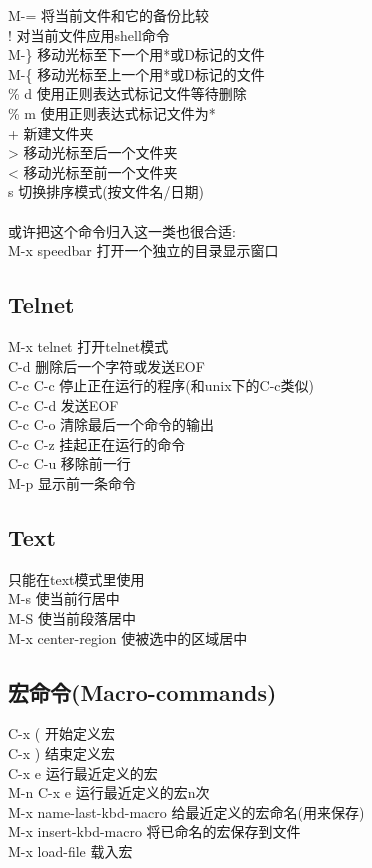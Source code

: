 \documentclass[11pt,a4paper,titlepage]{article}
\begin{document}
{M-= 将当前文件和它的备份比较\\
! 对当前文件应用shell命令\\
M-\} 移动光标至下一个用*或D标记的文件\\
M-\{ 移动光标至上一个用*或D标记的文件\\
\% d 使用正则表达式标记文件等待删除\\
\% m 使用正则表达式标记文件为*\\
+ 新建文件夹\\
> 移动光标至后一个文件夹\\
< 移动光标至前一个文件夹\\
s 切换排序模式(按文件名/日期)\\
  \\
或许把这个命令归入这一类也很合适:\\
M-x speedbar 打开一个独立的目录显示窗口\\

\subsection{Telnet}
M-x telnet 打开telnet模式\\
C-d 删除后一个字符或发送EOF\\
C-c C-c 停止正在运行的程序(和unix下的C-c类似)\\
C-c C-d 发送EOF\\
C-c C-o 清除最后一个命令的输出\\
C-c C-z 挂起正在运行的命令\\
C-c C-u 移除前一行\\
M-p 显示前一条命令\\

\subsection{Text}
只能在text模式里使用\\
M-s 使当前行居中\\
M-S 使当前段落居中\\
M-x center-region 使被选中的区域居中\\

\subsection{\kai 宏命令(Macro-commands)}
C-x ( 开始定义宏\\
C-x ) 结束定义宏\\
C-x e 运行最近定义的宏\\
M-n C-x e 运行最近定义的宏n次\\
M-x name-last-kbd-macro 给最近定义的宏命名(用来保存)\\
M-x insert-kbd-macro 将已命名的宏保存到文件\\
M-x load-file 载入宏\\

}
\end{document}
